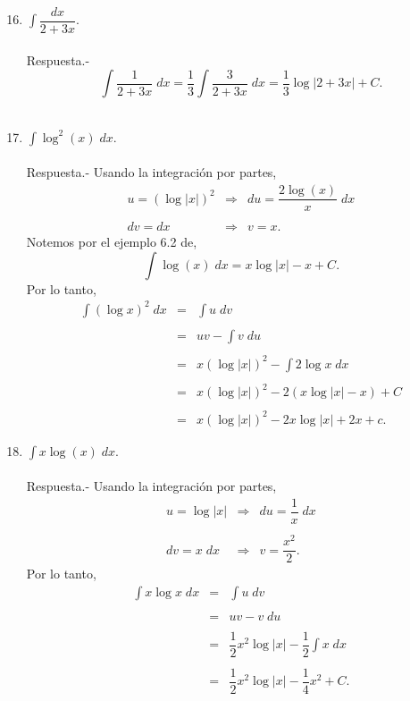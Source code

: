 \begin{enumerate}[\bfseries 1.]
\setcounter{enumi}{15}

    \item $\displaystyle\int \dfrac{dx}{2+3x}$.\\\\
	Respuesta.-\; 
	$$\int \dfrac{1}{2+3x}\; dx = \dfrac{1}{3}\int \dfrac{3}{2+3x}\; dx=\dfrac{1}{3}\log|2+3x|+C.$$\\

    \item $\displaystyle\int \log^2(x)\; dx$.\\\\
	Respuesta.-\; Usando la integración por partes,
	$$
	\begin{array}{rcl}
	    u=\left(\log|x|\right)^2 &\Rightarrow& du=\dfrac{2\log(x)}{x}\; dx\\\\
	    dv=dx &\Rightarrow& v=x.
	\end{array}
	$$
	Notemos por el ejemplo 6.2 de, 
	$$\int \log(x)\; dx = x\log|x|-x+C.$$
	Por lo tanto,
	$$
	\begin{array}{rcl}
	    \displaystyle\int (\log x)^2\; dx &=& \displaystyle\int u\; dv\\\\
					      &=& uv - \displaystyle\int v\; du\\\\
					      &=& x(\log|x|)^2-\displaystyle\int 2\log x \; dx\\\\
					      &=& x(\log|x|)^2 - 2(x\log|x|-x)+C\\\\
					      &=& x(\log|x|)^2-2x\log|x|+2x+c.
	\end{array}
	$$
	\vspace{.5cm}

    \item $\displaystyle\int x\log(x)\; dx$.\\\\
	Respuesta.-\; Usando la integración por partes,
	$$
	\begin{array}{rcl}
	    u=\log|x| &\Rightarrow& du=\dfrac{1}{x}\; dx\\\\
	    dv=x\;dx &\Rightarrow& v=\dfrac{x^2}{2}.
	\end{array}
	$$
	Por lo tanto,
	$$
	\begin{array}{rcl}
	    \displaystyle\int x\log x \; dx &=& \displaystyle\int u\; dv\\\\
					    &=& uv-\displaystyle v\; du\\\\
					    &=& \dfrac{1}{2}x^2\log|x|-\dfrac{1}{2}\displaystyle\int x\; dx\\\\
					    &=& \dfrac{1}{2}x^2\log|x|-\dfrac{1}{4}x^2+C.
	\end{array}
	$$
	\vspace{.5cm}


\end{enumerate}
